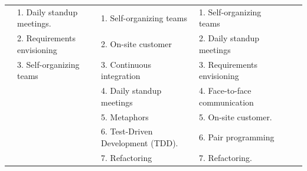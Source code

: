 \documentclass[a4paper,oneside]{bth}
\begin{document}
\begin{longtable}{|p{1.3cm}|p{2cm}|p{2cm}|p{2.7cm}|p{2cm} |p{2cm} |}
				& 1. Daily standup meetings.                           & 1. Self-organizing teams                                    & 1. Self-organizing teams                                                                            & \multirow{9}{*}{}                                      & \multirow{9}{*}{}                                                                            \\ \cline{2-4}
				& 2. Requirements envisioning                          & 2. On-site customer                                         & 2. Daily standup meetings                                                                           &                                                        &                                                                                              \\ \cline{2-4}
				& 3. Self-organizing teams                             & 3. Continuous integration                                   & 3. Requirements envisioning                                                                         &                                                        &                                                                                              \\ \cline{2-4}
				& \multirow{6}{*}{}                                    & 4. Daily standup meetings                                   & 4. Face-to-face communication                                                                       &                                                        &                                                                                              \\ \cline{3-4}
				&                                                      & 5. Metaphors                                                & 5. On-site customer.                                                                                &                                                        &                                                                                              \\ \cline{3-4}
				&                                                      & 6. Test-Driven Development (TDD).                           & 6. Pair programming                                                                                 &                                                        &                                                                                              \\ \cline{3-4}
				&                                                      & 7. Refactoring                                              & 7. Refactoring.                                                                                     &                                                        &                                                                                              \\ \cline{3-4}

\end{longtable}
\end{document}
